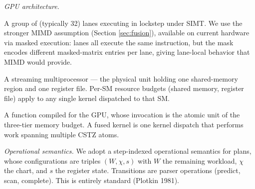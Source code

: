 \emph{GPU architecture.}
\begin{description}[nosep,leftmargin=1.5cm]
  \item[Warp / lane] A group of (typically 32) lanes
    executing in lockstep under SIMT. We use the
    stronger MIMD assumption (Section \ref{sec:fusion}),
    available on current hardware via masked execution:
    lanes all execute the same instruction, but the
    mask encodes different masked-matrix entries per
    lane, giving lane-local behavior that MIMD would
    provide.
  \item[SM] A streaming multiprocessor --- the physical
    unit holding one shared-memory region and one
    register file. Per-SM resource budgets (shared
    memory, register file) apply to any single kernel
    dispatched to that SM.
  \item[Kernel] A function compiled for the GPU, whose
    invocation is the atomic unit of the three-tier
    memory budget. A fused kernel is one kernel
    dispatch that performs work spanning multiple
    CSTZ atoms.
\end{description}

\emph{Operational semantics.} We adopt a
step-indexed operational semantics for plans,
whose configurations are triples $(W, \chi, s)$
with $W$ the remaining workload, $\chi$ the chart,
and $s$ the register state. Transitions are parser
operations (predict, scan, complete). This is
entirely standard (Plotkin 1981).
